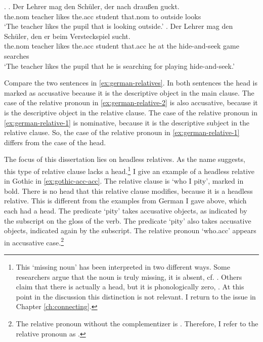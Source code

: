 \ex.\label{ex:german-relatives}
\ag. Der Lehrer mag den Schüler, der nach draußen guckt.\\
 the.\ac{nom} teacher likes the.\ac{acc} student that.\ac{nom} to outside looks\\
 `The teacher likes the pupil that is looking outside.'\label{ex:german-relative-1}
 \bg. Der Lehrer mag den Schüler, den er beim Versteckspiel sucht.\\
 the.\ac{nom} teacher likes the.\ac{acc} student that.\ac{acc} he {at the} {hide-and-seek game} searches\\
 `The teacher likes the pupil that he is searching for playing hide-and-seek.'\label{ex:german-relative-2}

Compare the two sentences in \ref{ex:german-relatives}. In both sentences the head is marked as accusative because it is the descriptive object in the main clause. The case of the relative pronoun in \ref{ex:german-relative-2} is also accusative, because it is the descriptive object in the relative clause. The case of the relative pronoun in \ref{ex:german-relative-1} is nominative, because it is the descriptive subject in the relative clause. So, the case of the relative pronoun in \ref{ex:german-relative-1} differs from the case of the head.

The focus of this dissertation lies on headless relatives. As the name suggests, this type of relative clause lacks a head.\footnote{
This `missing noun' has been interpreted in two different ways. Some researchers argue that the noun is truly missing, it is absent, cf. \citealt{citko2005,vanriemsdijk2006}. Others claim that there is actually a head, but it is phonologically zero, \citealt{bresnan1978,groos1981,grosu2003}. At this point in the discussion this distinction is not relevant. I return to the issue in Chapter \ref{ch:connecting}.
}
I give an example of a headless relative in Gothic in \ref{ex:gothic-acc-acc}. The relative clause is  `who I pity', marked in bold. There is no head that this relative clause modifies, because it is a headless relative. This is different from the examples from German I gave above, which each had a head.
The predicate  `pity' takes accusative objects, as indicated by the subscript on the gloss of the verb. The predicate  `pity' also takes accusative objects, indicated again by the subscript.
The relative pronoun  `who.\ac{acc}' appears in accusative case.\footnote{
The relative pronoun without the complementizer  is . Therefore, I refer to the relative pronoun as .
}

